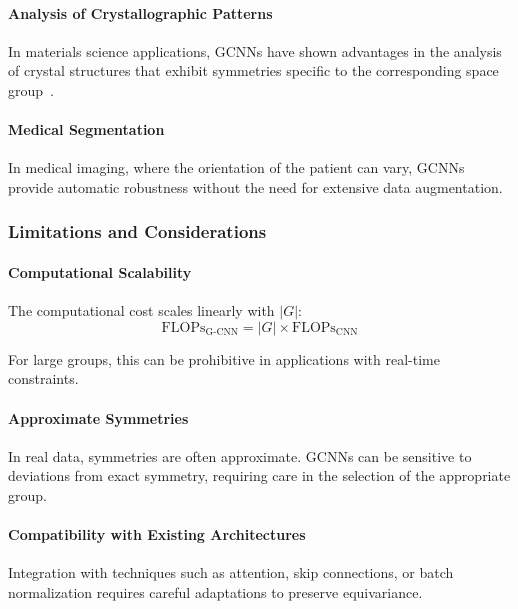 \paragraph{Analysis of Crystallographic Patterns}

In materials science applications, \glspl{GCNN} have shown advantages in the analysis of crystal structures that exhibit symmetries specific to the corresponding space group~\citep{weiler2018learningsteerable}.

\paragraph{Medical Segmentation}

In medical imaging, where the orientation of the patient can vary, \glspl{GCNN} provide automatic robustness without the need for extensive data augmentation.

\subsubsection{Limitations and Considerations}

\paragraph{Computational Scalability}

The computational cost scales linearly with $|G|$:
\begin{equation}
\text{FLOPs}_{\text{G-CNN}} = |G| \times \text{FLOPs}_{\text{CNN}}
\end{equation}

For large groups, this can be prohibitive in applications with real-time constraints.

\paragraph{Approximate Symmetries}

In real data, symmetries are often approximate. \glspl{GCNN} can be sensitive to deviations from exact symmetry, requiring care in the selection of the appropriate group.

\paragraph{Compatibility with Existing Architectures}

Integration with techniques such as attention, skip connections, or batch normalization requires careful adaptations to preserve equivariance.

